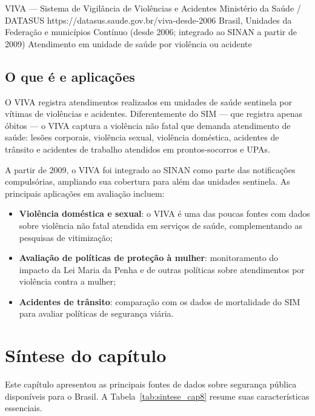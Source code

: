 \ficharapida
  {VIVA — Sistema de Vigilância de Violências e Acidentes}
  {Ministério da Saúde / DATASUS}
  {https://datasus.saude.gov.br/viva-desde-2006}
  {Brasil, Unidades da Federação e municípios}
  {Contínuo (desde 2006; integrado ao SINAN a partir de 2009)}
  {Atendimento em unidade de saúde por violência ou acidente}

\subsection{O que é e aplicações}

O VIVA registra atendimentos realizados em unidades de saúde sentinela por vítimas de violências e acidentes. Diferentemente do SIM --- que registra apenas óbitos --- o VIVA captura a violência não fatal que demanda atendimento de saúde: lesões corporais, violência sexual, violência doméstica, acidentes de trânsito e acidentes de trabalho atendidos em prontos-socorros e UPAs.

A partir de 2009, o VIVA foi integrado ao SINAN como parte das notificações compulsórias, ampliando sua cobertura para além das unidades sentinela. As principais aplicações em avaliação incluem:

\begin{itemize}
  \item \textbf{Violência doméstica e sexual}: o VIVA é uma das poucas fontes com dados sobre violência não fatal atendida em serviços de saúde, complementando as pesquisas de vitimização;
  \item \textbf{Avaliação de políticas de proteção à mulher}: monitoramento do impacto da Lei Maria da Penha e de outras políticas sobre atendimentos por violência contra a mulher;
  \item \textbf{Acidentes de trânsito}: comparação com os dados de mortalidade do SIM para avaliar políticas de segurança viária.
\end{itemize}

\section{Síntese do capítulo}

Este capítulo apresentou as principais fontes de dados sobre segurança pública disponíveis para o Brasil. A Tabela~\ref{tab:sintese_cap8} resume suas características essenciais.

